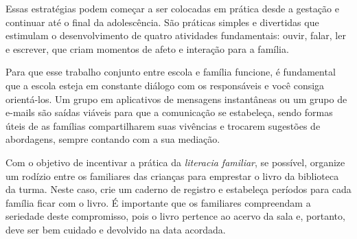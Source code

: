 \documentclass[11pt]{extarticle}
\begin{document}
Essas estratégias podem começar a ser colocadas em prática desde a 
gestação e continuar até o final da adolescência. São práticas simples e divertidas 
que estimulam o desenvolvimento de quatro atividades fundamentais: ouvir, falar, 
ler e escrever, que criam momentos de afeto e interação para a família. 

Para que esse trabalho conjunto entre escola e família funcione, é 
fundamental que a escola esteja em constante diálogo com os responsáveis e 
você consiga orientá-los. Um grupo em aplicativos de mensagens instantâneas ou um 
grupo de e-mails são saídas viáveis para que a comunicação se estabeleça, sendo formas úteis de as famílias compartilharem suas vivências e trocarem sugestões 
de abordagens, sempre contando com a sua mediação. 

Com o objetivo de incentivar 
a prática da \textit{literacia familiar}, se possível, organize um rodízio entre os familiares 
das crianças para emprestar o livro da biblioteca da turma. Neste caso, crie um caderno 
de registro e estabeleça períodos para cada família ficar com o livro. É importante 
que os familiares compreendam a seriedade deste compromisso, pois o livro pertence 
ao acervo da sala e, portanto, deve ser bem cuidado e devolvido na data acordada. 

\end{document}

